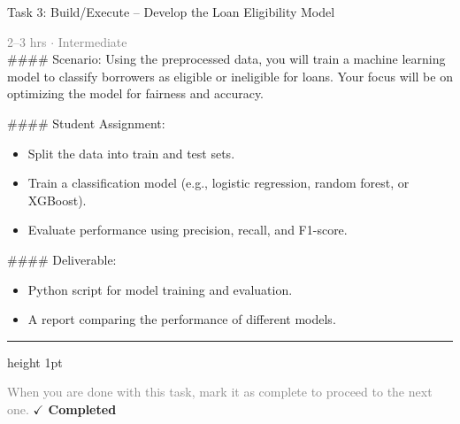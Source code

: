 \documentclass[10pt,a4paper]{article}
\begin{document}
\begin{taskbox}{Task 3: Build/Execute – Develop the Loan Eligibility Model}

    {\small \textcolor{gray}{2--3 hrs $\cdot$ Intermediate}}\\[12pt]

    \#\#\#\# Scenario:
Using the preprocessed data, you will train a machine learning model to classify borrowers as eligible or ineligible for loans. Your focus will be on optimizing the model for fairness and accuracy.

\#\#\#\# Student Assignment:
\begin{itemize}
    \item Split the data into train and test sets.
    \item Train a classification model (e.g., logistic regression, random forest, or XGBoost).
    \item Evaluate performance using precision, recall, and F1-score.
\end{itemize}

\#\#\#\# Deliverable:
\begin{itemize}
    \item Python script for model training and evaluation.
    \item A report comparing the performance of different models.\par
\end{itemize}

    \vspace{16pt}

    \textcolor{cardBorder}{\hrule height 1pt}\vspace{8pt}

    \small \textcolor{gray}{When you are done with this task, mark it as complete to proceed to the next one.} \hfill \textbf{\textcolor{brandDark}{$\checkmark$ Completed}}

\end{taskbox}
\end{document}
